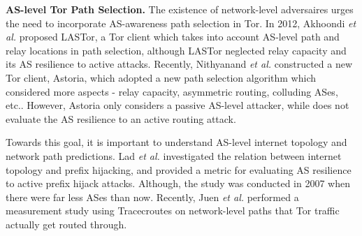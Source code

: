 \documentclass{acm_proc_article-sp}
\begin{document}
{\bf AS-level Tor Path Selection.}
The existence of network-level adversaires urges the need to incorporate AS-awareness path selection in Tor. In 2012, Akhoondi \emph{et al.} \cite{akhoondi2012lastor} proposed LASTor, a Tor client which takes into account AS-level path and relay locations in path selection, although LASTor neglected relay capacity and its AS resilience to active attacks. Recently, Nithyanand \emph{et al.} \cite{starov2015measuring} constructed a new Tor client, Astoria, which adopted a new path selection algorithm which considered more aspects - relay capacity, asymmetric routing, colluding ASes, etc.. However, Astoria only considers a passive AS-level attacker, while does not evaluate the AS resilience to an active routing attack.

Towards this goal, it is important to understand AS-level internet topology and network path predictions. Lad \emph{et al.} \cite{lad2007understanding} investigated the relation between internet topology and prefix hijacking, and provided a metric for evaluating AS resilience to active prefix hijack attacks. Although, the study was conducted in 2007 when there were far less ASes than now. Recently, Juen \emph{et al.} \cite{juen2014defending} performed a measurement study using Tracecroutes on network-level paths that Tor traffic actually get routed through. 


{\footnotesize 
}

\end{document}
